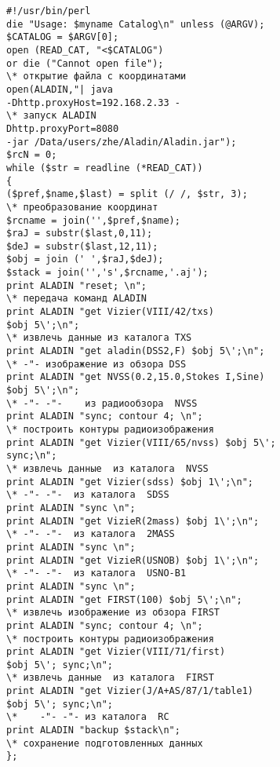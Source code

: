 \begin{multicols}{2}

\noindent
{\small
\begin{verbatim}
#!/usr/bin/perl
die "Usage: $myname Catalog\n" unless (@ARGV);
$CATALOG = $ARGV[0];
open (READ_CAT, "<$CATALOG") 
or die ("Cannot open file"); 
\* открытие файла с координатами
open(ALADIN,"| java 
-Dhttp.proxyHost=192.168.2.33 -       
\* запуск ALADIN
Dhttp.proxyPort=8080 
-jar /Data/users/zhe/Aladin/Aladin.jar");
$rcN = 0;
while ($str = readline (*READ_CAT))
{
($pref,$name,$last) = split (/ /, $str, 3);               
\* преобразование координат
$rcname = join('',$pref,$name);
$raJ = substr($last,0,11);
$deJ = substr($last,12,11);
$obj = join (' ',$raJ,$deJ);
$stack = join('','s',$rcname,'.aj');
print ALADIN "reset; \n";                                 
\* передача команд ALADIN
print ALADIN "get Vizier(VIII/42/txs) 
$obj 5\';\n";       
\* извлечь данные из каталога TXS
print ALADIN "get aladin(DSS2,F) $obj 5\';\n";            
\* -"- изображение из обзора DSS
print ALADIN "get NVSS(0.2,15.0,Stokes I,Sine) 
$obj 5\';\n"; 
\* -"- -"-    из радиообзора  NVSS
print ALADIN "sync; contour 4; \n";                       
\* построить контуры радиоизображения
print ALADIN "get Vizier(VIII/65/nvss) $obj 5\'; 
sync;\n";
\* извлечь данные  из каталога  NVSS
print ALADIN "get Vizier(sdss) $obj 1\';\n";              
\* -"- -"-  из каталога  SDSS
print ALADIN "sync \n";
print ALADIN "get VizieR(2mass) $obj 1\';\n";             
\* -"- -"-  из каталога  2MASS
print ALADIN "sync \n";
print ALADIN "get VizieR(USNOB) $obj 1\';\n";             
\* -"- -"-  из каталога  USNO-B1
print ALADIN "sync \n";
print ALADIN "get FIRST(100) $obj 5\';\n";                
\* извлечь изображение из обзора FIRST
print ALADIN "sync; contour 4; \n";                       
\* построить контуры радиоизображения
print ALADIN "get Vizier(VIII/71/first) 
$obj 5\'; sync;\n"; 
\* извлечь данные  из каталога  FIRST
print ALADIN "get Vizier(J/A+AS/87/1/table1) 
$obj 5\'; sync;\n"; 
\*    -"- -"- из каталога  RC
print ALADIN "backup $stack\n";                             
\* сохранение подготовленных данных
};
\end{verbatim}

}




\end{multicols}
